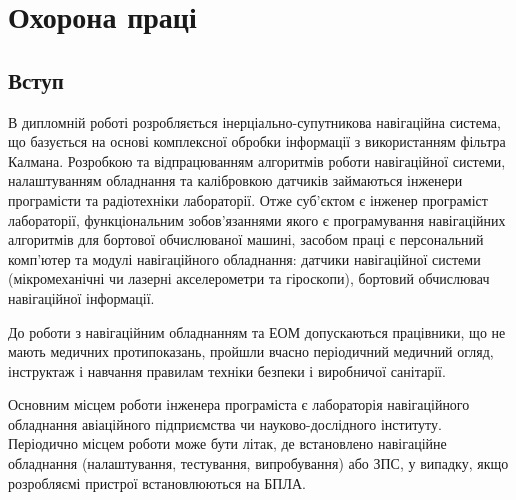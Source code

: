 % 
\section{Охорона праці}
\subsection{Вступ}

В дипломній роботі розробляється інерціально-супутникова навігаційна система, що базується на основі комплексної обробки інформації з використанням фільтра Калмана. Розробкою та відпрацюванням алгоритмів роботи навігаційної системи, налаштуванням обладнання та калібровкою датчиків займаються інженери програмісти та радіотехніки лабораторії. Отже суб’єктом є інженер програміст лабораторії, функціональним зобов'язаннями якого є програмування навігаційних алгоритмів для бортової обчислюваної машині, засобом праці є персональний комп'ютер та модулі навігаційного обладнання: датчики навігаційної системи (мікромеханічні чи лазерні акселерометри та гіроскопи), бортовий обчислювач навігаційної інформації.

До роботи з навігаційним обладнанням та ЕОМ допускаються працівники, що не мають медичних протипоказань, пройшли вчасно періодичний медичний огляд, інструктаж і навчання  правилам техніки безпеки і виробничої санітарії.

Основним місцем роботи інженера програміста є лабораторія навігаційного обладнання авіаційного підприємства чи науково-дослідного інституту. Періодично місцем роботи може бути літак, де встановлено навігаційне обладнання (налаштування, тестування, випробування) або ЗПС, у випадку, якщо розробляємі пристрої встановлюються на БПЛА.

